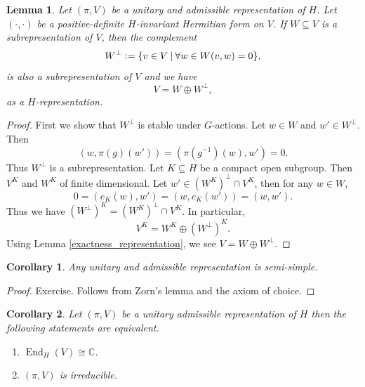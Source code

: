 \documentclass[8pt]{article}
\newtheorem{lemma}{Lemma}[section]
\newtheorem{corollary}{Corollary} [section]
\DeclareMathOperator{\End}{End}
\newcommand{\defeq}{\vcentcolon=}
\newcommand{\C}[0]{\mathbb{C}}
\newcommand{\sep}[0]{\:|\:}
\begin{document}
\begin{lemma}
  Let $(\pi,V)$ be a unitary and admissible representation of $H$. Let $(\cdot,\cdot)$ be a positive-definite $H$-invariant Hermitian form on $V$. 
  If $W\subseteq V$ is a subrepresentation of $V$, then the complement 
  \begin{equation*}
    W^\perp \defeq\{v\in V\sep\forall w\in W(v,w)=0\},
  \end{equation*}
  is also a subrepresentation of $V$ and we have 
  \begin{equation*}
    V = W\oplus W^\perp,
  \end{equation*}
  as a $H$-representation.
  \label{orthogonal_decomposition_representation}
\end{lemma}
\begin{proof}
  First we show that $W^\perp$ is stable under $G$-actions. Let $w\in W$ and $w'\in W^\perp$. Then 
  \begin{equation*}
    (w,\pi(g)(w')) = (\pi(g^{-1})(w),w') = 0.
  \end{equation*}
  Thus $W^\perp$ is a subrepresentation. Let $K\subseteq H$ be a compact open subgroup. Then $V^K$ and $W^K$ of finite dimensional. Let $w'\in (W^K)^\perp\cap V^K$, then for any $w\in W$,
  \begin{equation*}
    0=(e_K(w),w') = (w,e_K(w')) = (w,w').
  \end{equation*}
  Thus we have $(W^\perp)^K = (W^K)^{\perp}\cap V^K$. In particular,
  \begin{equation*}
    V^K = W^K\oplus (W^\perp)^K.
  \end{equation*}
  Using Lemma \ref{exactness_representation}, we see $V = W\oplus W^\perp$. 
\end{proof}

\begin{corollary}
  \label{corollary_13}
  Any unitary and admissible representation is semi-simple.
\end{corollary}

\begin{proof}
  Exercise. Follows from Zorn's lemma and the axiom of choice. 
\end{proof}

\begin{corollary}
  Let $(\pi,V)$ be a unitary admissible representation of $H$ then the following statements are equivalent.
  \begin{enumerate}[1).]
    \item $\End_H(V)\cong \C$.
    \item $(\pi,V)$ is irreducible.
  \end{enumerate}
\end{corollary}
\end{document}
